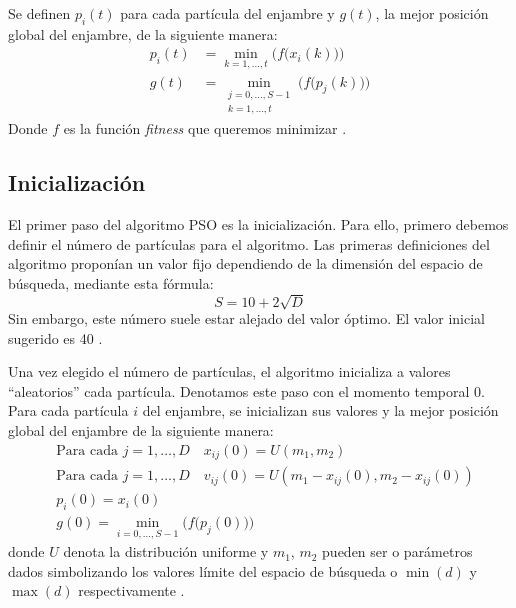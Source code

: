 Se definen $p_i(t)$ para cada partícula del enjambre y $g(t)$, la mejor posición global del enjambre, de la siguiente 
manera:
\begin{align}
    p_i(t)&=\min_{k=1,\dots,t}\Big(f\big(x_i(k)\big)\Big) \\
    g(t)&=\min_{\substack{j=0,\dots,S-1 \\ k=1,\dots,t}}\Big(f\big(p_j(k)\big)\Big)
\end{align}
Donde $f$ es la función \textit{fitness} que queremos minimizar \cite{gad_2022}.

\subsection{Inicialización}

El primer paso del algoritmo PSO es la inicialización. Para ello, primero debemos definir el número de partículas para
el algoritmo. Las primeras definiciones del algoritmo proponían un valor fijo dependiendo de la dimensión del espacio
de búsqueda, mediante esta fórmula:
\begin{equation}\label{eq:pso-init}
    S=10+2\sqrt{D}
\end{equation}
Sin embargo, este número suele estar alejado del valor óptimo. El valor inicial sugerido es 40 \cite{clerc_12}. 

\vspace{10pt}
Una vez elegido el número de partículas, el algoritmo inicializa a valores ``aleatorios'' cada partícula. Denotamos 
este paso con el momento temporal $0$. Para cada partícula $i$ del enjambre, se inicializan sus valores y la mejor
posición global del enjambre de la siguiente manera:
\begin{align}\label{eq:pso-part}
    &\text{Para cada }j=1,\dots,D\quad x_{ij}(0)=U(m_1,m_2) \\
    &\text{Para cada }j=1,\dots,D\quad v_{ij}(0)=U(m_1-x_{ij}(0),m_2-x_{ij}(0)) \\
    &p_i(0)=x_i(0) \\
    &g(0)=\min_{i=0,\dots,S-1}\Big(f\big(p_j(0)\big)\Big)
\end{align}
donde $U$ denota la distribución uniforme y $m_1$, $m_2$ pueden ser o parámetros dados simbolizando los valores límite
del espacio de búsqueda o $\min(d)$ y $\max(d)$ respectivamente \cite{clerc_12}.

